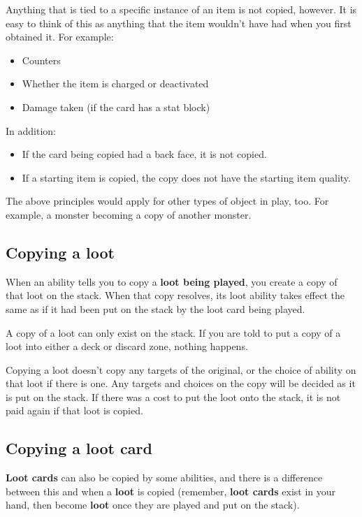 \documentclass[a4paper, twoside]{report} %
\begin{document}
    Anything that is tied to a specific instance of an item is not copied, however. It is easy to think of this as anything that the item wouldn’t have had when you first obtained it. For example:

    \begin{itemize}
        \item Counters
        \item Whether the item is charged or deactivated
        \item Damage taken (if the card has a stat block)
    \end{itemize}

    In addition:

    \begin{itemize}
        \item If the card being copied had a back face, it is not copied.
        \item If a starting item is copied, the copy does not have the starting item quality.
    \end{itemize}

    The above principles would apply for other types of object in play, too. For example, a monster becoming a copy of another monster.
    \subsection*{Copying a loot}
    When an ability tells you to copy a \textbf{loot being played}, you create a copy of that loot on the stack. When that copy resolves, its loot ability takes effect the same as if it had been put on the stack by the loot card being played.

    A copy of a loot can only exist on the stack. If you are told to put a copy of a loot into either a deck or discard zone, nothing happens.

    Copying a loot doesn’t copy any targets of the original, or the choice of ability on that loot if there is one. Any targets and choices on the copy will be decided as it is put on the stack. If there was a cost to put the loot onto the stack, it is not paid again if that loot is copied.
    \subsection*{Copying a loot card}
    \textbf{Loot cards} can also be copied by some abilities, and there is a difference between this and when a \textbf{loot} is copied (remember, \textbf{loot cards} exist in your hand, then become \textbf{loot} once they are played and put on the stack).
\end{document}
